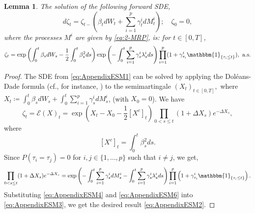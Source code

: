 \documentclass[11pt,a4paper]{article}
\numberwithin{equation}{section}
\theoremstyle{newPlain}
\newtheorem{lemma}[theorem]{Lemma}
\theoremstyle{newDefinition}
\theoremstyle{newRemark}
\begin{document}
\begin{appendices}
\begin{lemma}\label{lemma:expSemiMartingale}
The solution of     the following forward SDE,
    \begin{equation}\label{eq:AppendixESM1}
        d\zeta_t = \zeta_{t-}(\beta_tdW_t + \sum_{i=1}^p\gamma_t^idM_t^i);\quad\zeta_0=0,
    \end{equation}
    where the processes $M^i$ are given by \eqref{eq:2-MRP}, is: for $t\in[0,T]$,
    \begin{equation}\label{eq:AppendixESM2}
        \zeta_t = \exp\left(\int_0^t\beta_sdW_s-\frac{1}{2}\int_0^t\beta_s^2ds\right)\exp\left(-\int_0^t\sum_{i=1}^p\gamma_s^i\lambda_s^ids\right)\prod_{i=1}^p(1+\gamma_{\tau_i}^i\mathbbm{1}_{\{\tau_i\leq t\}}),\text{ a.s.}
    \end{equation}
\end{lemma}
\begin{proof}
    The SDE from  \eqref{eq:AppendixESM1} can be solved by applying the Dol\'eans-Dade formula (cf., for instance, \cite{jacod2013limit}) to the semimartingale $(X_t)_{t\in[0,T]},$ where $X_t\coloneqq\int_0^t\beta_sdW_s + \int_0^t\sum_{i=1}^p\gamma_s^idM_s^i$, (with $X_0=0$).
     We have 
    \begin{equation}\label{eq:AppendixESM3}
        \zeta_t=\mathcal{E}(X)_t = \exp\left(X_t-X_0-\frac{1}{2}[X^c]_t\right)\prod_{0<s\le t}(1+\Delta X_s)e^{-\Delta X_s},
    \end{equation}
    where
    \begin{equation}\label{eq:AppendixESM4}
        [X^c]_t = \int_0^t\beta_s^2ds.
    \end{equation}
    Since $P(\tau_i = \tau_j)=0$ for $i,j\in\{1,\ldots,p\}$ such that $i\ne j$, we get,
    \begin{align}\label{eq:AppendixESM6}
        \begin{aligned}
            \prod_{0<s\le t}(1+\Delta X_s)e^{-\Delta X_s}  %
            =\exp\left(-\int_0^t\sum_{i=1}^p\gamma_s^idM_s^i - \int_0^t\sum_{i=1}^p\gamma_s^i\lambda_s^ids\right)\prod_{i=1}^p\left(1+\gamma_{\tau_i}^i\mathbbm{1}_{\{\tau_i\le t\}}\right).
        \end{aligned}
    \end{align}
    Substituting \eqref{eq:AppendixESM4} and \eqref{eq:AppendixESM6} into \eqref{eq:AppendixESM3}, we get the desired result  \eqref{eq:AppendixESM2}.
\end{proof}

%
	
\end{appendices}
\newpage
\end{document}
